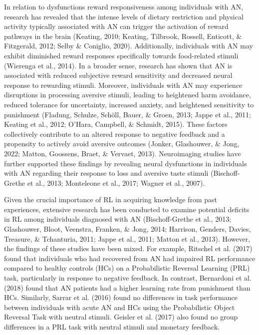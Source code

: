 \documentclass[
  man,floatsintext]{apa6}
\begin{document}
In relation to dysfunctions reward responsiveness among individuals with AN, research has revealed that the intense levels of dietary restriction and physical activity typically associated with AN can trigger the activation of reward pathways in the brain (Keating, 2010; Keating, Tilbrook, Rossell, Enticott, \& Fitzgerald, 2012; Selby \& Coniglio, 2020). Additionally, individuals with AN may exhibit diminished reward responses specifically towards food-related stimuli (Wierenga et al., 2014). In a broader sense, research has shown that AN is associated with reduced subjective reward sensitivity and decreased neural response to rewarding stimuli. Moreover, individuals with AN may experience disruptions in processing aversive stimuli, leading to heightened harm avoidance, reduced tolerance for uncertainty, increased anxiety, and heightened sensitivity to punishment (Fladung, Schulze, Schöll, Bauer, \& Groen, 2013; Jappe et al., 2011; Keating et al., 2012; O'Hara, Campbell, \& Schmidt, 2015). These factors collectively contribute to an altered response to negative feedback and a propensity to actively avoid aversive outcomes (Jonker, Glashouwer, \& Jong, 2022; Matton, Goossens, Braet, \& Vervaet, 2013). Neuroimaging studies have further supported these findings by revealing neural dysfunctions in individuals with AN regarding their response to loss and aversive taste stimuli (Bischoff-Grethe et al., 2013; Monteleone et al., 2017; Wagner et al., 2007).

Given the crucial importance of RL in acquiring knowledge from past experiences, extensive research has been conducted to examine potential deficits in RL among individuals diagnosed with AN (Bischoff-Grethe et al., 2013; Glashouwer, Bloot, Veenstra, Franken, \& Jong, 2014; Harrison, Genders, Davies, Treasure, \& Tchanturia, 2011; Jappe et al., 2011; Matton et al., 2013). However, the findings of these studies have been mixed. For example, Ritschel et al. (2017) found that individuals who had recovered from AN had impaired RL performance compared to healthy controls (HCs) on a Probabilistic Reversal Learning (PRL) task, particularly in response to negative feedback. In contrast, Bernardoni et al. (2018) found that AN patients had a higher learning rate from punishment than HCs. Similarly, Sarrar et al. (2016) found no differences in task performance between individuals with acute AN and HCs using the Probabilistic Object Reversal Task with neutral stimuli. Geisler et al. (2017) also found no group differences in a PRL task with neutral stimuli and monetary feedback.
\end{document}
